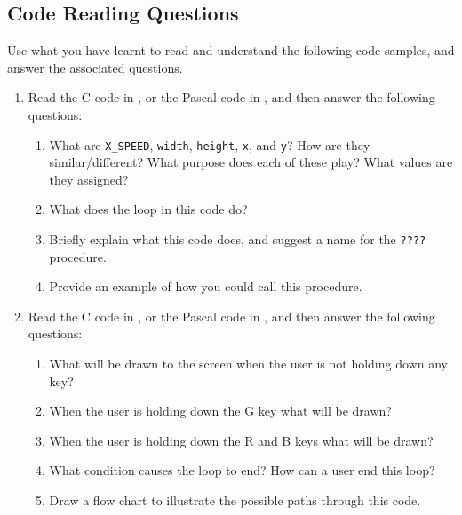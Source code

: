 \clearpage

\subsection{Code Reading Questions} %
\label{sub:code_reading_questions_flow}
Use what you have learnt to read and understand the following code samples, and answer the associated questions.
\begin{enumerate}
  \item Read the C code in , or the Pascal code in , and then answer the following questions:
  \begin{enumerate}
    \item What are \texttt{X\_SPEED}, \texttt{width}, \texttt{height}, \texttt{x}, and \texttt{y}? How are they similar/different? What purpose does each of these play? What values are they assigned?
    \item What does the loop in this code do?
    \item Briefly explain what this code does, and suggest a name for the \texttt{????} procedure.
    \item Provide an example of how you could call this procedure.
  \end{enumerate}
  
  \begin{figure}[h]
  \end{figure}
  \begin{figure}[h]
  \end{figure}
  
  \item Read the C code in , or the Pascal code in , and then answer the following questions:
  \begin{enumerate}
    \item What will be drawn to the screen when the user is not holding down any key?
    \item When the user is holding down the G key what will be drawn?
    \item When the user is holding down the R and B keys what will be drawn?
    \item What condition causes the loop to end? How can a user end this loop?
    \item Draw a flow chart to illustrate the possible paths through this code.
  \end{enumerate}
  \begin{figure}[h]
  \end{figure}
  \begin{figure}[h]
  \end{figure}
  \clearpage
  

\end{enumerate}
